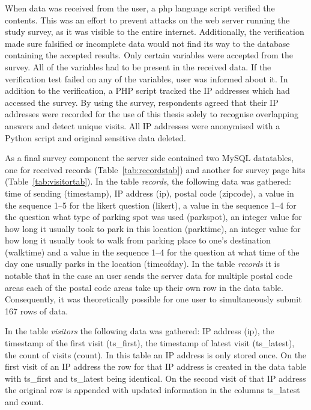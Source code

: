 When data was received from the user, a \gls{php} language script verified the contents. This was an effort to prevent attacks on the web server running the study survey, as it was visible to the entire internet. Additionally, the verification made sure falsified or incomplete data would not find its way to the database containing the accepted results. Only certain variables were accepted from the survey. All of the variables had to be present in the received data. If the verification test failed on any of the variables, user was informed about it. In addition to the verification, a PHP script tracked the IP addresses which had accessed the survey. By using the survey, respondents agreed that their IP addresses were recorded for the use of this thesis solely to recognise overlapping answers and detect unique visits. All IP addresses were anonymised with a Python script and original sensitive data deleted.

As a final survey component the server side contained two MySQL datatables, one for received records (Table~\ref{tab:recordstab}) and another for survey page hits (Table~\ref{tab:visitortab}). In the table \textit{records}, the following data was gathered: time of sending (timestamp), IP address (ip), postal code (zipcode), a value in the sequence 1--5 for the likert question (likert), a value in the sequence 1--4 for the question what type of parking spot was used (parkspot), an integer value for how long it usually took to park in this location (parktime), an integer value for how long it usually took to walk from parking place to one's destination (walktime) and a value in the sequence 1--4 for the question at what time of the day one usually parks in the location (timeofday). In the table \textit{records} it is notable that in the case an user sends the server data for multiple postal code areas each of the postal code areas take up their own row in the data table. Consequently, it was theoretically possible for one user to simultaneously submit 167 rows of data.

In the table \textit{visitors} the following data was gathered: IP address (ip), the timestamp of the first visit (ts\_first), the timestamp of latest visit (ts\_latest), the count of visits (count). In this table an IP address is only stored once. On the first visit of an IP address the row for that IP address is created in the data table with ts\_first and ts\_latest being identical. On the second visit of that IP address the original row is appended with updated information in the columns ts\_latest and count.

